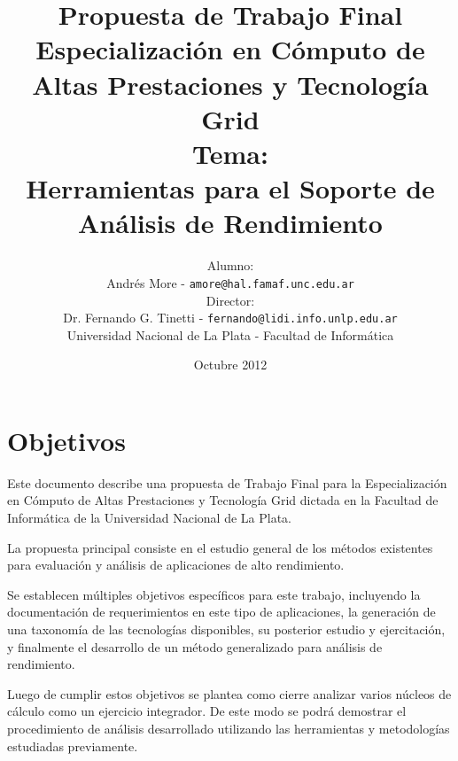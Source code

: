 \documentclass[a4paper]{article}
\begin{document}
\title{Propuesta de Trabajo Final\\
\bigskip
Especializaci\'on en C\'omputo de Altas Prestaciones y Tecnolog\'ia Grid\\
\bigskip
Tema:\\
Herramientas para el Soporte de An\'alisis de Rendimiento}

\author{Alumno:\\Andr\'es More - {\tt amore@hal.famaf.unc.edu.ar}
\\Director:\\Dr. Fernando G. Tinetti - {\tt fernando@lidi.info.unlp.edu.ar}
\bigskip
\\Universidad Nacional de La Plata - Facultad de Inform\'atica}

\date{Octubre 2012}

\maketitle

\newpage

\section{Objetivos}

  Este documento describe una propuesta de Trabajo Final para la
  Especializaci\'on en C\'omputo de Altas Prestaciones y Tecnolog\'ia Grid
  dictada en la Facultad de Inform\'atica de la Universidad Nacional de La
  Plata.

  \smallskip

  La propuesta principal consiste en el estudio general de los m\'etodos
  existentes para evaluaci\'on y an\'alisis de aplicaciones de alto
  rendimiento.

  \smallskip

  Se establecen m\'ultiples objetivos espec\'ificos para
  este trabajo, incluyendo la documentaci\'on de requerimientos en este
  tipo de aplicaciones, la generaci\'on de una taxonom\'ia de las
  tecnolog\'ias disponibles, su posterior estudio y ejercitaci\'on, y
  finalmente el desarrollo de un m\'etodo generalizado para an\'alisis de
  rendimiento.

  \smallskip

  Luego de cumplir estos objetivos se plantea como cierre analizar
  varios n\'ucleos de c\'alculo como un ejercicio integrador. De este modo
  se podr\'a demostrar el procedimiento de an\'alisis desarrollado
  utilizando las herramientas y metodolog\'ias estudiadas previamente.
\end{document}
